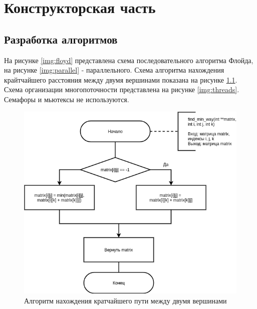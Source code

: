 \chapter{Конструкторская часть}

\section{Разработка алгоритмов}

На рисунке \ref{img:floyd} представлена схема последовательного алгоритма Флойда, на рисунке \ref{img:parallel} - параллельного. Схема алгоритма нахождения крайтчайшего расстояния между двумя вершинами показана на рисунке \ref{img:min}. Схема организации многопоточности представлена на рисунке \ref{img:threads}. Семафоры и мьютексы не используются.

\begin{figure}[H]
	\begin{center}
		\includegraphics[scale=0.6]{images/min.png}
	\end{center}
	\captionsetup{justification=centering}
	\caption{Алгоритм нахождения кратчайшего пути между двумя вершинами}
	\label{img:min}
\end{figure}

